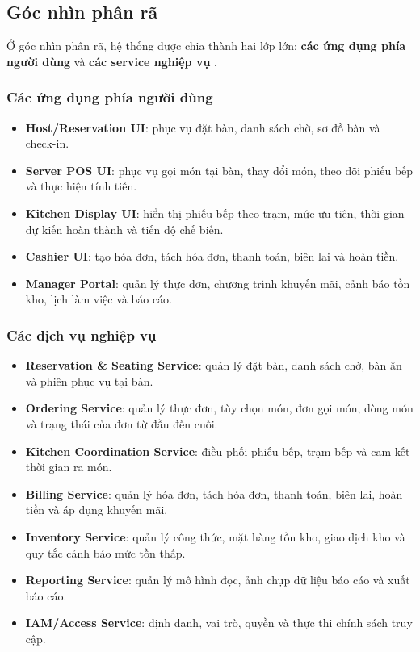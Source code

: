 \subsection{Góc nhìn phân rã}\label{sec:module-view}
Ở góc nhìn phân rã, hệ thống được chia thành hai lớp lớn:
\textbf{các ứng dụng phía người dùng} và \textbf{các service nghiệp vụ }.

\subsubsection{Các ứng dụng phía người dùng}
\begin{itemize}
  \item \textbf{Host/Reservation UI}: phục vụ đặt bàn, danh sách chờ, sơ đồ bàn và check-in.
  \item \textbf{Server POS UI}: phục vụ gọi món tại bàn, thay đổi món, theo dõi phiếu bếp và thực hiện tính tiền.
  \item \textbf{Kitchen Display UI}: hiển thị phiếu bếp theo trạm, mức ưu tiên, thời gian dự kiến hoàn thành và tiến độ chế biến.
  \item \textbf{Cashier UI}: tạo hóa đơn, tách hóa đơn, thanh toán, biên lai và hoàn tiền.
  \item \textbf{Manager Portal}: quản lý thực đơn, chương trình khuyến mãi, cảnh báo tồn kho, lịch làm việc và báo cáo.
\end{itemize}

\subsubsection{Các dịch vụ nghiệp vụ }
\begin{itemize}
  \item \textbf{Reservation \& Seating Service}: quản lý đặt bàn, danh sách chờ, bàn ăn và phiên phục vụ tại bàn.
  \item \textbf{Ordering Service}: quản lý thực đơn, tùy chọn món, đơn gọi món, dòng món và trạng thái của đơn từ đầu đến cuối.
  \item \textbf{Kitchen Coordination Service}: điều phối phiếu bếp, trạm bếp và cam kết thời gian ra món.
  \item \textbf{Billing Service}: quản lý hóa đơn, tách hóa đơn, thanh toán, biên lai, hoàn tiền và áp dụng khuyến mãi.
  \item \textbf{Inventory Service}: quản lý công thức, mặt hàng tồn kho, giao dịch kho và quy tắc cảnh báo mức tồn thấp.
  \item \textbf{Reporting Service}: quản lý mô hình đọc, ảnh chụp dữ liệu báo cáo và xuất báo cáo.
  \item \textbf{IAM/Access Service}: định danh, vai trò, quyền và thực thi chính sách truy cập.
\end{itemize}


